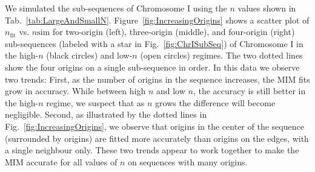 		We simulated the sub-sequences of Chromosome I using the $n$ values shown in Tab.~\ref{tab:LargeAndSmallN}.
		Figure~\ref{fig:IncreasingOrigins} shows a scatter plot of $n_\text{fit}$ vs. $n\text{sim}$ for two-origin (left), three-origin (middle), and four-origin (right) sub-sequences (labeled with a star in Fig.~\ref{fig:ChrISubSeq}) of Chromosome I in the high-$n$ (black circles) and low-$n$ (open circles) regimes.
		The two dotted lines show the four origins on a single sub-sequence in order.
		In this data we observe two trends:
		First, as the number of origins in the sequence increases, the MIM fits grow in accuracy.
		While between high $n$ and low $n$, the accuracy is still better in the high-$n$ regime, we suspect that as $n$ grows the difference will become negligible.
		Second, as illustrated by the dotted lines in Fig.~\ref{fig:IncreasingOrigins}, we observe that origins in the center of the sequence (surrounded by origins) are fitted more accurately than origins on the edges, with a single neighbour only.
		These two trends appear to work together to make the MIM accurate for all values of $n$ on sequences with many origins.
		





































